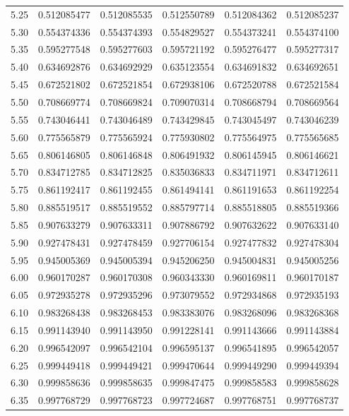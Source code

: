 \documentclass[11pt,a4paper]{article}
\begin{document}
\begin{longtable}{rrrrrr}
5.25 & 0.512085477 & 0.512085535 & 0.512550789 & 0.512084362 & 0.512085237 \\
5.30 & 0.554374336 & 0.554374393 & 0.554829527 & 0.554373241 & 0.554374100 \\
5.35 & 0.595277548 & 0.595277603 & 0.595721192 & 0.595276477 & 0.595277317 \\
5.40 & 0.634692876 & 0.634692929 & 0.635123554 & 0.634691832 & 0.634692651 \\
5.45 & 0.672521802 & 0.672521854 & 0.672938106 & 0.672520788 & 0.672521584 \\
5.50 & 0.708669774 & 0.708669824 & 0.709070314 & 0.708668794 & 0.708669564 \\
5.55 & 0.743046441 & 0.743046489 & 0.743429845 & 0.743045497 & 0.743046239 \\
5.60 & 0.775565879 & 0.775565924 & 0.775930802 & 0.775564975 & 0.775565685 \\
5.65 & 0.806146805 & 0.806146848 & 0.806491932 & 0.806145945 & 0.806146621 \\
5.70 & 0.834712785 & 0.834712825 & 0.835036833 & 0.834711971 & 0.834712611 \\
5.75 & 0.861192417 & 0.861192455 & 0.861494141 & 0.861191653 & 0.861192254 \\
5.80 & 0.885519517 & 0.885519552 & 0.885797714 & 0.885518805 & 0.885519366 \\
5.85 & 0.907633279 & 0.907633311 & 0.907886792 & 0.907632622 & 0.907633140 \\
5.90 & 0.927478431 & 0.927478459 & 0.927706154 & 0.927477832 & 0.927478304 \\
5.95 & 0.945005369 & 0.945005394 & 0.945206250 & 0.945004831 & 0.945005256 \\
6.00 & 0.960170287 & 0.960170308 & 0.960343330 & 0.960169811 & 0.960170187 \\
6.05 & 0.972935278 & 0.972935296 & 0.973079552 & 0.972934868 & 0.972935193 \\
6.10 & 0.983268438 & 0.983268453 & 0.983383076 & 0.983268096 & 0.983268368 \\
6.15 & 0.991143940 & 0.991143950 & 0.991228141 & 0.991143666 & 0.991143884 \\
6.20 & 0.996542097 & 0.996542104 & 0.996595137 & 0.996541895 & 0.996542057 \\
6.25 & 0.999449418 & 0.999449421 & 0.999470644 & 0.999449290 & 0.999449394 \\
6.30 & 0.999858636 & 0.999858635 & 0.999847475 & 0.999858583 & 0.999858628 \\
6.35 & 0.997768729 & 0.997768723 & 0.997724687 & 0.997768751 & 0.997768737 \\

\end{longtable}
\end{document}
